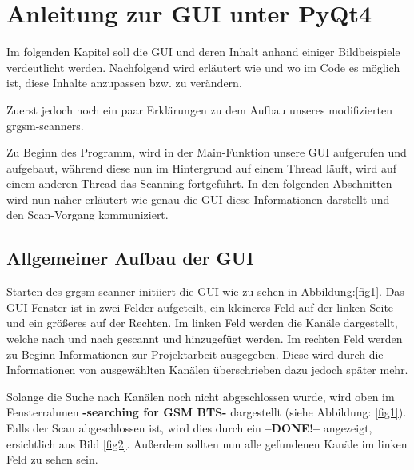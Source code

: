 
\chapter{Anleitung zur GUI unter PyQt4}

Im folgenden Kapitel soll die GUI und deren Inhalt anhand einiger Bildbeispiele verdeutlicht werden.
Nachfolgend wird erläutert wie und wo im Code es möglich ist, diese Inhalte anzupassen bzw. zu verändern.

Zuerst jedoch noch ein paar Erklärungen zu dem Aufbau unseres modifizierten grgsm-scanners.

Zu Beginn des Programm, wird in der Main-Funktion unsere GUI aufgerufen und aufgebaut, während diese nun im Hintergrund auf einem Thread läuft, wird auf einem anderen Thread das Scanning fortgeführt.
In den folgenden Abschnitten wird nun näher erläutert wie genau die GUI diese Informationen darstellt und den Scan-Vorgang kommuniziert.

\section{Allgemeiner Aufbau der GUI}


Starten des grgsm-scanner initiiert die GUI wie zu sehen in Abbildung:\ref{fig1}.
Das GUI-Fenster ist in zwei Felder aufgeteilt, ein kleineres Feld auf der linken Seite
und ein größeres auf der Rechten.
Im linken Feld werden die Kanäle dargestellt, welche nach und nach gescannt und hinzugefügt werden.
Im rechten Feld werden zu Beginn Informationen zur Projektarbeit ausgegeben. Diese wird durch die Informationen von ausgewählten Kanälen überschrieben dazu jedoch später mehr.


\noindent Solange die Suche nach Kanälen noch nicht abgeschlossen wurde, wird oben im Fensterrahmen \textbf{-searching for GSM BTS-} dargestellt (siehe Abbildung: \ref{fig1}).
Falls der Scan abgeschlossen ist, wird dies durch ein \textbf{--DONE!--} angezeigt, ersichtlich aus Bild \ref{fig2}. Außerdem sollten nun alle gefundenen Kanäle im linken Feld zu sehen sein.

%
%



